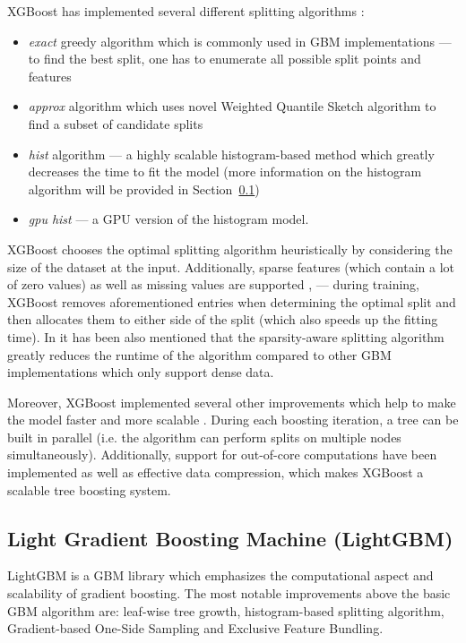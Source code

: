 \documentclass[magisterska, english]{pwr_wmat_praca_dyplomowa}
\theoremstyle{plain}
\numberwithin{theorem}{chapter}
\theoremstyle{definition}
\numberwithin{theorem}{chapter}
\begin{document}
XGBoost has implemented several different splitting algorithms \cite{xgboost}:
\begin{itemize}
    \item\emph{exact} greedy algorithm which is commonly used in GBM implementations --- to find the best split, one has to enumerate all possible split points and features
    \item\emph{approx} algorithm which uses novel Weighted Quantile Sketch algorithm \cite{xgboost} to find a subset of candidate splits
    \item\emph{hist} algorithm --- a highly scalable histogram-based method which greatly decreases the time to fit the model (more information on the histogram algorithm will be provided in Section~\ref{section:lightgbm})
    \item\emph{gpu hist} --- a GPU version of the histogram model.
\end{itemize}
XGBoost chooses the optimal splitting algorithm heuristically by considering the size of the dataset at the input. Additionally, sparse features (which contain a lot of zero values) as well as missing values are supported \cite{comparative_analysis}, \cite{comparison_of} --- during training, XGBoost removes aforementioned entries when determining the optimal split and then allocates them to either side of the split (which also speeds up the fitting time). In \cite{xgboost} it has been also mentioned that the sparsity-aware splitting algorithm greatly reduces the runtime of the algorithm compared to other GBM implementations which only support dense data.

Moreover, XGBoost implemented several other improvements which help to make the model faster and more scalable \cite{xgboost}. During each boosting iteration, a tree can be built in parallel (i.e. the algorithm can perform splits on multiple nodes simultaneously). Additionally, support for out-of-core computations have been implemented as well as effective data compression, which makes XGBoost a scalable tree boosting system.

\subsection{Light Gradient Boosting Machine (LightGBM)}\label{section:lightgbm}
LightGBM \cite{lightgbm} is a GBM library which emphasizes the computational aspect and scalability of gradient boosting. The most notable improvements above the basic GBM algorithm \cite{friedman_gbm} are: leaf-wise tree growth, histogram-based splitting algorithm, Gradient-based One-Side Sampling and Exclusive Feature Bundling.
\end{document}
